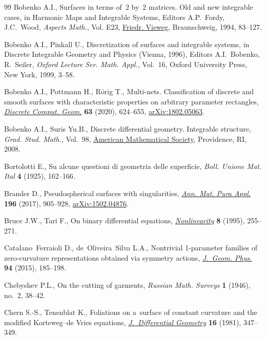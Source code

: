 \documentclass[pdftex]{sigma}
\numberwithin{equation}{section}
\begin{document}
\begin{thebibliography}{99}
Bobenko A.I., Surfaces in terms of~{$2$} by~{$2$} matrices. {O}ld and new
  integrable cases, in Harmonic Maps and Integrable Systems, Editors A.P.~Fordy, J.C.~Wood, \textit{Aspects
  Math.}, Vol. E23, \href{https://doi.org/10.1007/978-3-663-14092-4_5}{Friedr. Vieweg}, Braunschweig, 1994, 83--127.

Bobenko A.I., Pinkall U., Discretization of surfaces and integrable systems, in
  Discrete Integrable Geometry and Physics ({V}ienna, 1996),  Editors A.I.~Bobenko, R.~Seiler, \textit{Oxford
  Lecture Ser. Math. Appl.}, Vol.~16, Oxford University Press, New York, 1999,
  3--58.

Bobenko A.I., Pottmann H., R\"orig T., Multi-nets. {C}lassification of discrete
  and smooth surfaces with characteristic properties on arbitrary parameter
  rectangles, \href{https://doi.org/10.1007/s00454-019-00101-1}{\textit{Discrete Comput. Geom.}} \textbf{63} (2020), 624--655,
  \href{https://arxiv.org/abs/1802.05063}{arXiv:1802.05063}.

Bobenko A.I., Suris Yu.B., Discrete differential geometry. Integrable structure,
  \textit{Grad. Stud. Math.}, Vol.~98, \href{https://doi.org/10.1090/gsm/098}{American Mathematical Society},
  Providence, RI, 2008.

Bortolotti E., Su alcune questioni di geometria delle superficie, \textit{Boll.
  Unione Mat. Ital} \textbf{4} (1925), 162--166.

Brander D., Pseudospherical surfaces with singularities, \href{https://doi.org/10.1007/s10231-016-0601-8}{\textit{Ann. Mat. Pura
  Appl.}} \textbf{196} (2017), 905--928, \href{https://arxiv.org/abs/1502.04876}{arXiv:1502.04876}.

Bruce J.W., Tari F., On binary differential equations, \href{https://doi.org/10.1088/0951-7715/8/2/008}{\textit{Nonlinearity}}
  \textbf{8} (1995), 255--271.

Catalano~Ferraioli D., de~Oliveira~Silva L.A., Nontrivial 1-parameter families
  of zero-curvature representations obtained via symmetry actions,
  \href{https://doi.org/10.1016/j.geomphys.2015.04.001}{\textit{J.~Geom. Phys.}} \textbf{94} (2015), 185--198.

Chebyshev P.L., On the cutting of garments, \textit{Russian Math. Surveys}
  \textbf{1} (1946), no.~2, 38--42.

Chern S.-S., Tenenblat K., Foliations on a~surface of constant curvature and the
  modified {K}orteweg--de {V}ries equations, \href{https://doi.org/10.4310/jdg/1214436216}{\textit{J.~Differential Geometry}}
  \textbf{16} (1981), 347--349.


\end{thebibliography}
\end{document}

